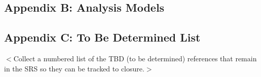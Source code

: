 \documentclass[draftclsnofoot,onecolumn,10pt]{IEEEtran}
\begin{document}
\subsection{Appendix B: Analysis Models}

\subsection{Appendix C: To Be Determined List}
$<$Collect a numbered list of the TBD (to be determined) references that remain 
in the SRS so they can be tracked to closure.$>$
\end{document}
